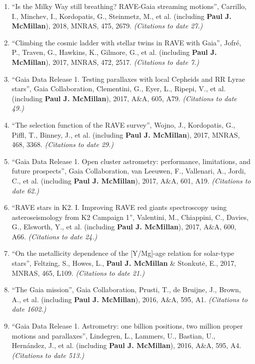 \documentclass{resume}
\begin{document}
\begin{enumerate}
\item ``Is the Milky Way still breathing? RAVE-Gaia streaming motions'', Carrillo, I., Minchev, I., Kordopatis, G., Steinmetz, M., et al. (including \textbf{Paul J. McMillan}), 2018, MNRAS, 475, 2679. \textit{(Citations to date 27.)}

\item ``Climbing the cosmic ladder with stellar twins in RAVE with Gaia'', Jofr\'e, P., Traven, G., Hawkins, K., Gilmore, G., et al. (including \textbf{Paul J. McMillan}), 2017, MNRAS, 472, 2517. \textit{(Citations to date 7.)}

\item ``Gaia Data Release 1. Testing parallaxes with local Cepheids and RR Lyrae stars'', Gaia Collaboration, Clementini, G., Eyer, L., Ripepi, V., et al. (including \textbf{Paul J. McMillan}), 2017, A\&A, 605, A79. \textit{(Citations to date 49.)}

\item ``The selection function of the RAVE survey'', Wojno, J., Kordopatis, G., Piffl, T., Binney, J., et al. (including \textbf{Paul J. McMillan}), 2017, MNRAS, 468, 3368. \textit{(Citations to date 29.)}

\item ``Gaia Data Release 1. Open cluster astrometry: performance, limitations, and future prospects'', Gaia Collaboration, van Leeuwen, F., Vallenari, A., Jordi, C., et al. (including \textbf{Paul J. McMillan}), 2017, A\&A, 601, A19. \textit{(Citations to date 62.)}

\item ``RAVE stars in K2. I. Improving RAVE red giants spectroscopy using asteroseismology from K2 Campaign 1'', Valentini, M., Chiappini, C., Davies, G., Elsworth, Y., et al. (including \textbf{Paul J. McMillan}), 2017, A\&A, 600, A66. \textit{(Citations to date 24.)}

\item ``On the metallicity dependence of the [Y/Mg]-age relation for solar-type stars'', Feltzing, S., Howes, L., \textbf{Paul J. McMillan} \& Stonkut\.{e}, E., 2017, MNRAS, 465, L109. \textit{(Citations to date 21.)}

\item ``The Gaia mission'', Gaia Collaboration, Prusti, T., de Bruijne, J., Brown, A., et al. (including \textbf{Paul J. McMillan}), 2016, A\&A, 595, A1. \textit{(Citations to date 1602.)}

\item ``Gaia Data Release 1. Astrometry: one billion positions, two million proper motions and parallaxes'', Lindegren, L., Lammers, U., Bastian, U., Hern\'andez, J., et al. (including \textbf{Paul J. McMillan}), 2016, A\&A, 595, A4. \textit{(Citations to date 513.)}


\end{enumerate}
\end{document}
